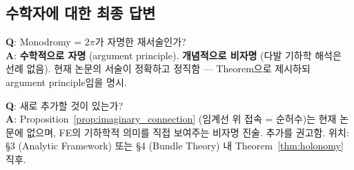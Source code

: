 \documentclass[11pt]{article}
\begin{document}
\subsection{수학자에 대한 최종 답변}

\textbf{Q}: Monodromy = $2\pi$가 자명한 재서술인가?\\
\textbf{A}: \textbf{수학적으로 자명} (argument principle). \textbf{개념적으로 비자명}
(다발 기하학 해석은 선례 없음). 현재 논문의 서술이 정확하고 정직함 —
Theorem으로 제시하되 argument principle임을 명시.

\textbf{Q}: 새로 추가할 것이 있는가?\\
\textbf{A}: Proposition~\ref{prop:imaginary_connection} (임계선 위 접속 = 순허수)는
현재 논문에 없으며, FE의 기하학적 의미를 직접 보여주는 비자명 진술.
추가를 권고함. 위치: §3 (Analytic Framework) 또는 §4 (Bundle Theory) 내
Theorem~\ref*{thm:holonomy} 직후.
\end{document}
